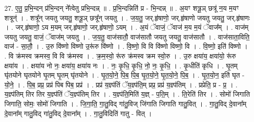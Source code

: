 \documentclass[17pt]{extarticle}
\begin{document}
27. ए॒तु॒ प्र॒भि॒न्दन् प्र॑भि॒न्दन् ने᳚त्वेतु प्रभि॒न्दन्न् ॥ . प्र॒भि॒न्दन्निति॑ प्र - भि॒न्दन्न् ॥ . अ॒यꣳ शत्रू॒ञ् छत्रू॑ न॒य म॒यꣳ शत्रून्॑ । . शत्रू᳚न् जयतु जयतु॒ शत्रू॒ञ् छत्रू᳚न् जयतु । . ज॒य॒तु॒ जर्.हृ॑षाणो॒ जर्.हृ॑षाणो जयतु जयतु॒ जर्.हृ॑षाणः । . जर्.हृ॑षाणो॒ ऽय म॒यम् जर्.हृ॑षाणो॒ जर्.हृ॑षाणो॒ ऽयम् । . अ॒यं ॅवाजं॒ ॅवाज॑ म॒य म॒यं ॅवाज᳚म् । . वाज॑म् जयतु जयतु॒ वाजं॒ ॅवाज॑म् जयतु । . ज॒य॒तु॒ वाज॑सातौ॒ वाज॑सातौ जयतु जयतु॒ वाज॑सातौ । . वाज॑साता॒विति॒ वाज॑ - सा॒तौ॒ । . उ॒रु वि॑ष्णो विष्णो उ॒रू॑रु वि॑ष्णो । . वि॒ष्णो॒ वि वि वि॑ष्णो विष्णो॒ वि । . वि॒ष्णो॒ इति॑ विष्णो । . वि क्र॑मस्व क्रमस्व॒ वि वि क्र॑मस्व । . क्र॒म॒स्वो॒ रू॑रु क्र॑मस्व क्रम स्वो॒रु । . उ॒रु क्षया॑य॒ क्षया॑यो॒ रू॑रु क्षया॑य । . क्षया॑य नो नः॒ क्षया॑य॒ क्षया॑य नः । . नः॒ कृ॒धि॒ कृ॒धि॒ नो॒ नः॒ कृ॒धि॒ । . कृ॒धीति॑ कृधि । . घृ॒तम् घृ॑तयोने घृतयोने घृ॒तम् घृ॒तम् घृ॑तयोने । . घृ॒त॒यो॒ने॒ पि॒ब॒ पि॒ब॒ घृ॒त॒यो॒ने॒ घृ॒त॒यो॒ने॒ पि॒ब॒ । . घृ॒त॒यो॒न॒ इति॑ घृत - यो॒ने॒ । . पि॒ब॒ प्रप्र॒ प्रप्र॑ पिब पिब॒ प्रप्र॑ । . प्रप्र॑ य॒ज्ञ्प॑तिं ॅय॒ज्ञ्प॑ति॒म् प्रप्र॒ प्रप्र॑ य॒ज्ञ्प॑तिम् । . प्रप्रेति॒ प्र - प्र॒ । . य॒ज्ञ्प॑तिम् तिर तिर य॒ज्ञ्प॑तिं ॅय॒ज्ञ्प॑तिम् तिर । . य॒ज्ञ्प॑ति॒मिति॑ य॒ज्ञ् - प॒ति॒म् । . ति॒रेति॑ तिर । . सोमो॑ जिगाति जिगाति॒ सोमः॒ सोमो॑ जिगाति । . जि॒गा॒ति॒ गा॒तु॒विद् गा॑तु॒विज् जि॑गाति जिगाति गातु॒वित् । . गा॒तु॒विद् दे॒वाना᳚म् दे॒वाना᳚म् गातु॒विद् गा॑तु॒विद् दे॒वाना᳚म् । . गा॒तु॒विदिति॑ गातु - वित् । \newline
\end{document}
